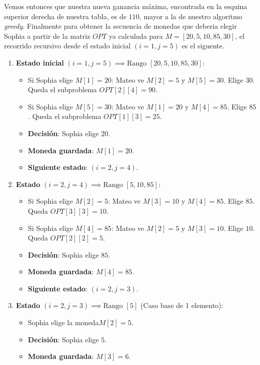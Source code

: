 Vemos entonces que nuestra nueva ganancia máxima, encontrada en la esquina superior derecha de nuestra tabla, es de $110$, mayor a la de nuestro algoritmo \textit{greedy}. Finalmente para obtener la secuencia de monedas que deberia elegir Sophia a partir de la matriz $OPT$ ya calculada para $M = [20, 5, 10, 85, 30]$, el recorrido recursivo desde el estado inicial $(i=1, j=5)$ es el siguente.

\begin{enumerate}
    \item \textbf{Estado inicial} $(i=1, j=5) \implies \text{Rango } [20, 5, 10, 85, 30]$:
    \begin{itemize}
        \item Si Sophia elige $M[1] = 20$: Mateo ve $M[2]=5$ y $M[5]=30$. Elige $30$. Queda el subproblema $OPT[2][4] = 90$.
        \item Si Sophia elige $M[5] = 30$: Mateo ve $M[1]=20$ y $M[4]=85$. Elige $85$. Queda el subproblema $OPT[1][3] = 25$.
        \item \textbf{Decisión}: Sophia elige $20$.
        \item \textbf{Moneda guardada}: $M[1] = 20$.
        \item \textbf{Siguiente estado}: $(i=2, j=4)$.
    \end{itemize}

    \item \textbf{Estado} $(i=2, j=4) \implies \text{Rango } [5, 10, 85]$:
    \begin{itemize}
        \item Si Sophia elige $M[2] = 5$: Mateo ve $M[3]=10$ y $M[4]=85$. Elige $85$. Queda $OPT[3][3] = 10$.
        \item Si Sophia elige $M[4] = 85$: Mateo ve $M[2]=5$ y $M[3]=10$. Elige $10$. Queda $OPT[2][2] = 5$.
        \item \textbf{Decisión}: Sophia elige $85$.
        \item \textbf{Moneda guardada}: $M[4] = 85$.
        \item \textbf{Siguiente estado}: $(i=2, j=3)$.
    \end{itemize}

    \item \textbf{Estado} $(i=2, j=3) \implies \text{Rango } [5]$ (Caso base de 1 elemento):
    \begin{itemize}
        \item Sophia elige la moneda$M[2]=5$.
        \item \textbf{Decisión}: Sophia elige $5$.
        \item \textbf{Moneda guardada}: $M[3] = 6$.
    \end{itemize}
\end{enumerate}

